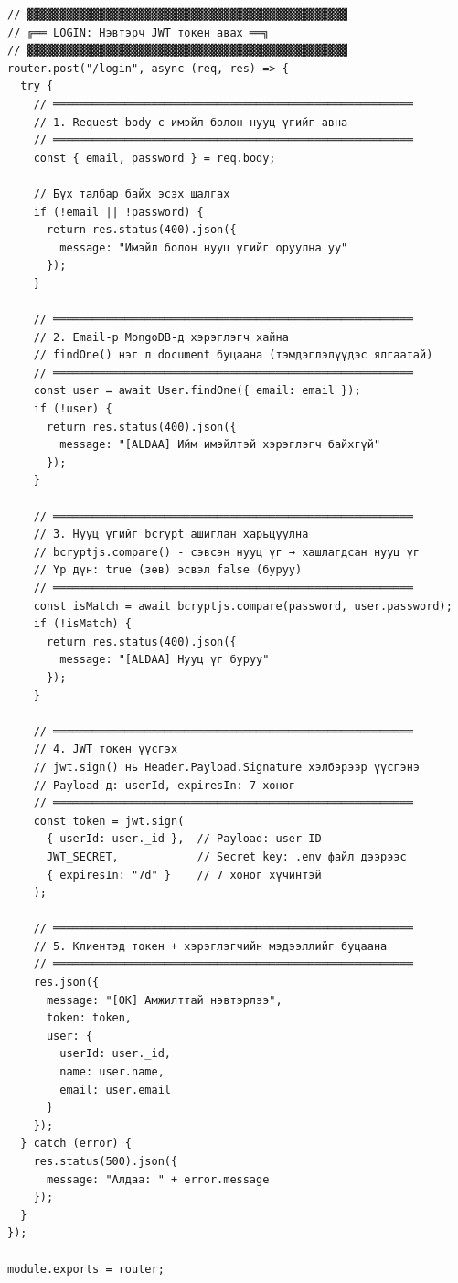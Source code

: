 \begin{lstlisting}[caption={routes/auth.js -- Нэвтрэх endpoint}]
// ▓▓▓▓▓▓▓▓▓▓▓▓▓▓▓▓▓▓▓▓▓▓▓▓▓▓▓▓▓▓▓▓▓▓▓▓▓▓▓▓▓▓▓▓▓▓▓▓▓
// ╔══ LOGIN: Нэвтэрч JWT токен авах ══╗
// ▓▓▓▓▓▓▓▓▓▓▓▓▓▓▓▓▓▓▓▓▓▓▓▓▓▓▓▓▓▓▓▓▓▓▓▓▓▓▓▓▓▓▓▓▓▓▓▓▓
router.post("/login", async (req, res) => {
  try {
    // ═══════════════════════════════════════════════════════
    // 1. Request body-с имэйл болон нууц үгийг авна
    // ═══════════════════════════════════════════════════════
    const { email, password } = req.body;

    // Бүх талбар байх эсэх шалгах
    if (!email || !password) {
      return res.status(400).json({
        message: "Имэйл болон нууц үгийг оруулна уу"
      });
    }

    // ═══════════════════════════════════════════════════════
    // 2. Email-р MongoDB-д хэрэглэгч хайна
    // findOne() нэг л document буцаана (тэмдэглэлүүдэс ялгаатай)
    // ═══════════════════════════════════════════════════════
    const user = await User.findOne({ email: email });
    if (!user) {
      return res.status(400).json({
        message: "[ALDAA] Ийм имэйлтэй хэрэглэгч байхгүй"
      });
    }

    // ═══════════════════════════════════════════════════════
    // 3. Нууц үгийг bcrypt ашиглан харьцуулна
    // bcryptjs.compare() - сэвсэн нууц үг → хашлагдсан нууц үг
    // Үр дүн: true (зөв) эсвэл false (буруу)
    // ═══════════════════════════════════════════════════════
    const isMatch = await bcryptjs.compare(password, user.password);
    if (!isMatch) {
      return res.status(400).json({
        message: "[ALDAA] Нууц үг буруу"
      });
    }

    // ═══════════════════════════════════════════════════════
    // 4. JWT токен үүсгэх
    // jwt.sign() нь Header.Payload.Signature хэлбэрээр үүсгэнэ
    // Payload-д: userId, expiresIn: 7 хоног
    // ═══════════════════════════════════════════════════════
    const token = jwt.sign(
      { userId: user._id },  // Payload: user ID
      JWT_SECRET,            // Secret key: .env файл дээрээс
      { expiresIn: "7d" }    // 7 хоног хүчинтэй
    );

    // ═══════════════════════════════════════════════════════
    // 5. Клиентэд токен + хэрэглэгчийн мэдээллийг буцаана
    // ═══════════════════════════════════════════════════════
    res.json({
      message: "[OK] Амжилттай нэвтэрлээ",
      token: token,
      user: {
        userId: user._id,
        name: user.name,
        email: user.email
      }
    });
  } catch (error) {
    res.status(500).json({
      message: "Алдаа: " + error.message
    });
  }
});

module.exports = router;
\end{lstlisting}

